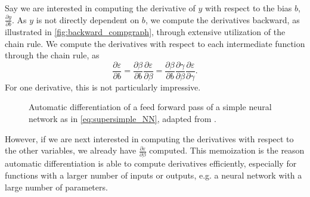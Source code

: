 Say we are interested in computing the derivative of $y$ with respect to the bias $b$, $\frac{\partial y}{\partial b}$.
As $y$ is not directly dependent on $b$, we compute the derivatives backward, as illustrated in \autoref{fig:backward_compgraph}, through extensive utilization of the chain rule.
We compute the derivatives with respect to each intermediate function through the chain rule, as
\begin{equation}
    \frac{\partial \varepsilon}{\partial b} = \frac{\partial \beta}{\partial b} \frac{\partial \varepsilon}{\partial \beta} = 
    \frac{\partial \beta}{\partial b}
    \frac{\partial \gamma}{\partial \beta}
    \frac{\partial \varepsilon}{\partial \gamma}.
\end{equation}
For one derivative, this is not particularly impressive.

\begin{figure}[h]
\centering

\caption{Automatic differentiation of a feed forward pass of a simple neural network as in \eqref{eq:supersimple_NN}, adapted from \cite{autodiff}.}
\label{fig:backward_compgraph}
\end{figure}

However, if we are next interested in computing the derivatives with respect to the other variables, we already have $\frac{\partial \varepsilon}{\partial \beta}$ computed.
This memoization is the reason automatic differentiation is able to compute derivatives efficiently, especially for functions with a larger number of inputs or outputs, e.g. a neural network with a large number of parameters.




